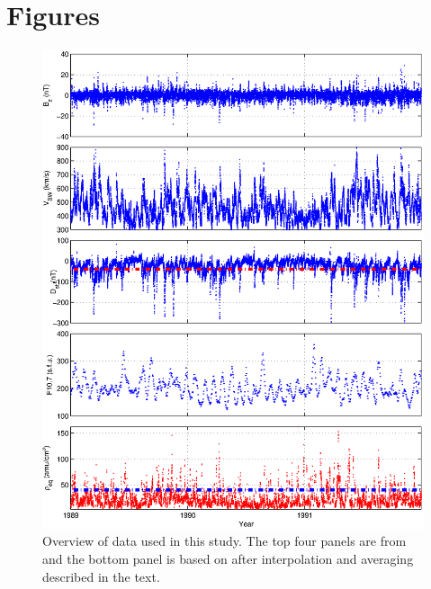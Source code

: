\documentclass[10pt,twocolumn]{article}
\begin{document}
\newpage
\footnotesize




\section{Figures}

\begin{figure}[htp]
\centering
\includegraphics[scale=0.7]{paperfigures/alldata.eps}
\caption{Overview of data used in this study. The top four panels are from \cite{Reconstruction} and the bottom panel is based on \cite{Denton} after interpolation and averaging described in the text.}
\label{AllData}
\end{figure}
\clearpage
\end{document}
